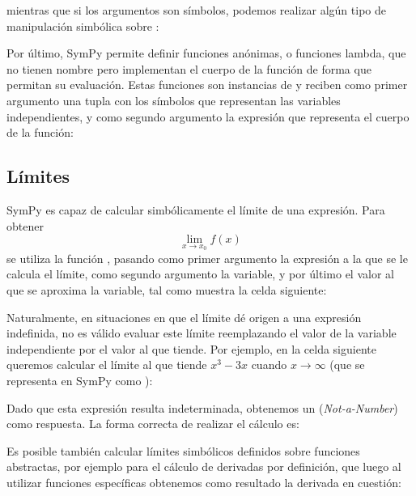 \noindent mientras que si los argumentos son símbolos, podemos realizar algún tipo de manipulación simbólica sobre :



Por último, SymPy permite definir funciones anónimas, o funciones lambda, que no tienen nombre pero implementan el cuerpo de la función de forma que permitan su evaluación. Estas funciones son instancias de  y reciben como primer argumento una tupla con los símbolos que representan las variables independientes, y como segundo argumento la expresión que representa el cuerpo de la función:


\subsection{Límites}
SymPy es capaz de calcular simbólicamente el límite de una expresión. Para obtener
\[ \lim_{x \rightarrow x_0} f(x) \]
se utiliza la función , pasando como primer argumento la expresión a la que se le calcula el límite, como segundo argumento la variable, y por último el valor al que se aproxima la variable, tal como muestra la celda siguiente:


Naturalmente, en situaciones en que el límite dé origen a una expresión indefinida, no es válido evaluar este límite reemplazando el valor de la variable independiente por el valor al que tiende. Por ejemplo, en la celda siguiente queremos calcular el límite al que tiende $x^{3} - 3 x$ cuando $x \rightarrow \infty$ (que se representa en SymPy como ):


Dado que esta expresión resulta indeterminada, obtenemos un  (\textit{Not-a-Number}) como respuesta. La forma correcta de realizar el cálculo es:


Es posible también calcular límites simbólicos definidos sobre funciones abstractas, por ejemplo para el cálculo de derivadas por definición, que luego al utilizar funciones específicas obtenemos como resultado la derivada en cuestión: 

